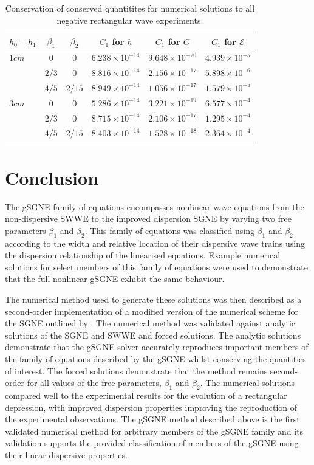 \documentclass[10pt]{elsarticle}
\newcommand\T{\rule{0pt}{3ex }}       %
\newcommand\B{\rule[-4ex]{0pt}{4ex }} %
\begin{document}
\begin{table}
	\centering
	\begin{tabular}{l c c c c c}
		$h_0 - h_1$& $\beta_1$ & $\beta_2$ &$C_1$ for $h$ & $C_1$ for $G$ & $C_1$ for $\mathcal{E}$ \B \\
		\hline 
		$1cm$ &$0$ & $0$ & $6.238\times 10^{-14}$&    $9.648\times 10^{-20}$ & $4.939\times 10^{-5}$ \T\\
		&$2/3$ & $0$ &   $8.816\times 10^{-14}$  &  $2.156\times 10^{-17}$  &  $5.898\times 10^{-6}$
		\T\\	
		&$4/5$ & $2/15$ &   $8.949\times 10^{-14}$   &  $1.056\times 10^{-17}$  &  $1.579\times 10^{-5}$ \T \B\\
		\hline 
		$3cm$ &$0$ & $0$ & $5.286\times 10^{-14}$  &  $3.221\times 10^{-19}$  &  $6.577\times 10^{-4}$ \T\\
		&$2/3$ & $0$ & $8.715\times 10^{-14}$   &  $2.106\times 10^{-17}$  &  $1.295\times 10^{-4}$ \T\\
		&$4/5$ & $2/15$ & $8.403\times 10^{-14}$ &  $1.528\times 10^{-18}$  &  $2.364\times 10^{-4}$  \T\\
	\end{tabular}
	\caption{Conservation of conserved quantitites for numerical solutions to all negative rectangular wave experiments.}
	\label{tab:Neg_Wave_Cons}
\end{table} 


\section{Conclusion}
The gSGNE family of equations encompasses nonlinear wave equations from the non-dispersive SWWE to the improved dispersion SGNE by varying two free parameters $\beta_1$ and $\beta_2$. This family of equations was classified using  $\beta_1$ and $\beta_2$ according to the width and relative location of their dispersive wave trains using the dispersion relationship of the linearised equations. Example numerical solutions for select members of this family of equations were used to demonstrate that the full nonlinear gSGNE exhibit the same behaviour. 

The numerical method used to generate these solutions was then described as a second-order implementation of a modified version of the numerical scheme for the SGNE outlined by \citet{Zoppou-etal-2017}. The numerical method was validated against analytic solutions of the SGNE and SWWE and forced solutions. The analytic solutions demonstrate that the gSGNE solver accurately reproduces important members of the family of equations described by the gSGNE whilst conserving the quantities of interest. The forced solutions demonstrate that the method remains second-order for all values of the free parameters, $\beta_1$ and $\beta_2$. The numerical solutions compared well to the experimental results for the evolution of a rectangular depression, with improved dispersion properties improving the reproduction of the experimental observations. The gSGNE method described above is the first validated numerical method for arbitrary members of the gSGNE family and its validation supports the provided classification of members of the gSGNE using their linear dispersive properties.


 

\end{document}
